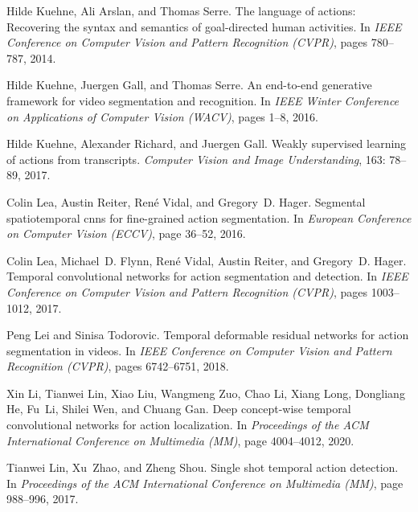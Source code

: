 \documentclass{bmvc2k}
\begin{document}
\begin{thebibliography}{53}
Hilde Kuehne, Ali Arslan, and Thomas Serre.
\newblock The language of actions: Recovering the syntax and semantics of
  goal-directed human activities.
\newblock In \emph{{IEEE} Conference on Computer Vision and Pattern Recognition
  (CVPR)}, pages 780--787, 2014.

Hilde Kuehne, Juergen Gall, and Thomas Serre.
\newblock An end-to-end generative framework for video segmentation and
  recognition.
\newblock In \emph{{IEEE} Winter Conference on Applications of Computer Vision
  (WACV)}, pages 1--8, 2016.

Hilde Kuehne, Alexander Richard, and Juergen Gall.
\newblock Weakly supervised learning of actions from transcripts.
\newblock \emph{Computer Vision and Image Understanding}, 163: 78--89,
  2017.

Colin Lea, Austin Reiter, {Ren\'e} Vidal, and Gregory~D. Hager.
\newblock Segmental spatiotemporal cnns for fine-grained action segmentation.
\newblock In \emph{European Conference on Computer Vision (ECCV)}, page
  36–52, 2016.

Colin Lea, Michael~D. Flynn, René Vidal, Austin Reiter, and Gregory~D. Hager.
\newblock Temporal convolutional networks for action segmentation and
  detection.
\newblock In \emph{{IEEE} Conference on Computer Vision and Pattern Recognition
  (CVPR)}, pages 1003--1012, 2017.

Peng Lei and Sinisa Todorovic.
\newblock Temporal deformable residual networks for action segmentation in
  videos.
\newblock In \emph{{IEEE} Conference on Computer Vision and Pattern Recognition
  (CVPR)}, pages 6742--6751, 2018.

Xin Li, Tianwei Lin, Xiao Liu, Wangmeng Zuo, Chao Li, Xiang Long, Dongliang He,
  Fu~Li, Shilei Wen, and Chuang Gan.
\newblock Deep concept-wise temporal convolutional networks for action
  localization.
\newblock In \emph{Proceedings of the ACM International Conference on
  Multimedia (MM)}, page 4004–4012, 2020.

Tianwei Lin, Xu~Zhao, and Zheng Shou.
\newblock Single shot temporal action detection.
\newblock In \emph{Proceedings of the ACM International Conference on
  Multimedia (MM)}, page 988–996, 2017.


\end{thebibliography}
\end{document}
